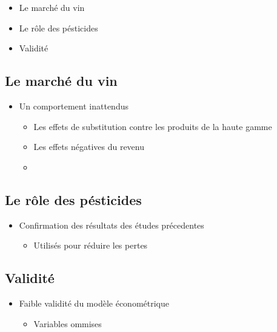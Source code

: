 \documentclass[11pt,]{article}
\providecommand{\tightlist}{%
  \setlength{\itemsep}{0pt}\setlength{\parskip}{0pt}}
\begin{document}
\begin{itemize}
\tightlist
\item
  Le marché du vin
\item
  Le rôle des pésticides\\
\item
  Validité
\end{itemize}

\FloatBarrier

\hypertarget{le-marche-du-vin}{%
\subsection{Le marché du vin}\label{le-marche-du-vin}}

\begin{itemize}
\tightlist
\item
  Un comportement inattendus

  \begin{itemize}
  \item
    Les effets de substitution contre les produits de la haute gamme
  \item
    Les effets négatives du revenu
  \item
  \end{itemize}
\end{itemize}

\FloatBarrier

\hypertarget{le-role-des-pesticides}{%
\subsection{Le rôle des pésticides}\label{le-role-des-pesticides}}

\begin{itemize}
\tightlist
\item
  Confirmation des résultats des études précedentes

  \begin{itemize}
  \tightlist
  \item
    Utilisés pour réduire les pertes
  \end{itemize}
\end{itemize}

\FloatBarrier

\hypertarget{validite}{%
\subsection{Validité}\label{validite}}

\begin{itemize}
\tightlist
\item
  Faible validité du modèle économétrique

  \begin{itemize}
  \tightlist
  \item
    Variables ommises
  \end{itemize}
\end{itemize}
\end{document}
